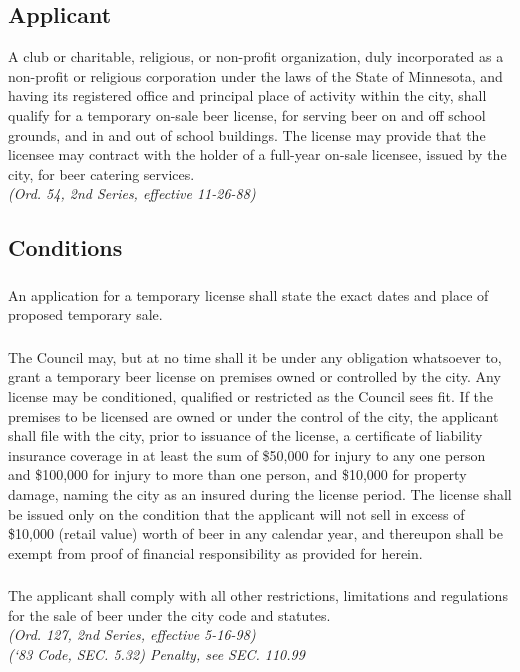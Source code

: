 \subsection{Applicant}
A club or charitable, religious, or non-profit organization, duly incorporated as a non-profit or religious corporation under the laws of the State of Minnesota, and having its registered office and principal place of activity within the city, shall qualify for a temporary on-sale beer license, for serving beer on and off school grounds, and in and out of school buildings.  The license may provide that the licensee may contract with the holder of a full-year on-sale licensee, issued by the city, for beer catering services.\\
\emph{(Ord. 54, 2nd Series, effective 11-26-88)}
\subsection{Conditions}
\subsubsection{}
An application for a temporary license shall state the exact dates and place of proposed temporary sale.
\subsubsection{}
The Council may, but at no time shall it be under any obligation whatsoever to, grant a temporary beer license on premises owned or controlled by the city.  Any license may be conditioned, qualified or restricted as the Council sees fit.  If the premises to be licensed are owned or under the control of the city, the applicant shall file with the city, prior to issuance of the license, a certificate of liability insurance coverage in at least the sum of \$50,000 for injury to any one person and \$100,000 for injury to more than one person, and \$10,000 for property damage, naming the city as an insured during the license period.  The license shall be issued only on the condition that the applicant will not sell in excess of \$10,000 (retail value) worth of beer in any calendar year, and thereupon shall be exempt from proof of financial responsibility as provided for herein.
\subsubsection{}
The applicant shall comply with all other restrictions, limitations and regulations for the sale of beer under the city code and statutes.\\
\emph{(Ord. 127, 2nd Series, effective 5-16-98)}\\
\emph{(‘83 Code, SEC. 5.32)  Penalty, see SEC. 110.99}
